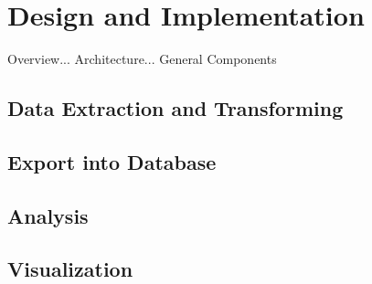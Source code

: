 \chapter{Design and Implementation}
\label{chap:implementation}

Overview... Architecture... General Components

\section{Data Extraction and Transforming}

\section{Export into Database}

\section{Analysis}

\section{Visualization}
